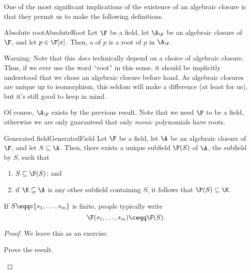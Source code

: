 One of the most significant implications of the existence of an algebraic closure is that they permit us to make the following definitions.
\begin{dfn}{Absolute root}{AbsoluteRoot}
	Let $\F$ be a field, let $\A _{\F}$ be an algebraic closure of $\F$, and let $p\in \F [x]$.  Then, a  of $p$ is a root of $p$ in $\A _{\F}$.
	\begin{rmk}
		Warning:  Note that this \emph{does} technically depend on a choice of algebraic closure.  Thus, if we ever use the word ``root'' in this sense, it should be implicitly understood that we chose an algebraic closure before hand.  As algebraic closures are unique up to isomorphism, this seldom will make a difference (at least for us), but it's still good to keep in mind.
	\end{rmk}
	\begin{rmk}
		Of course, $\A _{\F}$ exists by the previous result.  Note that we need $\F$ to be a field, otherwise we are only guaranteed that only \emph{monic} polynomials have roots.
	\end{rmk}
\end{dfn}
\begin{prp}{Generated field}{GeneratedField}
	Let $\F$ be a field, let $\A$ be an algebraic closure of $\F$, and let $S\subseteq \A$.  Then, there exists a unique subfield $\F (S)$ of $\A$, the subfield  by $S$, such that
	\begin{enumerate}
		\item $S\subseteq \F (S)$; and
		\item if $\K \subseteq \A$ is any other subfield containing $S$, it follows that $\F (S)\subseteq \K$.
	\end{enumerate}
	\begin{rmk}
		If $S\eqqc \{ s_1,\ldots ,s_m\}$ is finite, people typically write
		\begin{equation}
			\F (s_1,\ldots ,s_m)\ceqq \F (S).
		\end{equation}
	\end{rmk}
	\begin{proof}
		We leave this as an exercise.
		\begin{exr}[breakable=false]{}{}
			Prove the result.
		\end{exr}
	\end{proof}
\end{prp}

